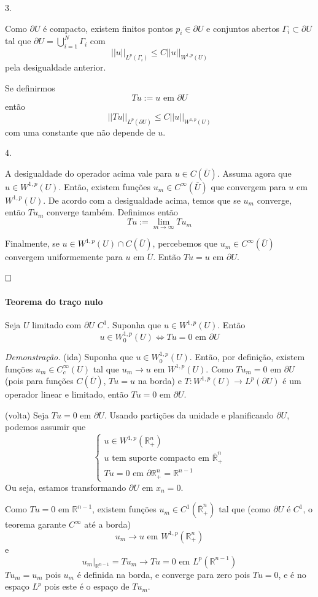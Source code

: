\documentclass[11pt]{article}
\newcommand{\qed}{$\hfill\square$}
\newcommand{\R}{\mathbb{R}}
\newcommand{\p}{\partial}
\newcommand{\pu}{\partial U}
\begin{document}
3.

Como $\pu$ é compacto, existem finitos pontos $p_i \in \pu$ e conjuntos abertos $\Gamma_i \subset \pu$ tal que $\pu = \bigcup_{i=1}^N \Gamma_i$ com \[ ||u||_{L^p(\Gamma_i)} \leq C ||u||_{W^{1,p}(U)} \] pela desigualdade anterior.

Se definirmos \[ Tu := u \text{ em } \pu \] então \[ ||Tu||_{L^p(\pu)} \leq C ||u||_{W^{1,p}(U)} \] com uma constante que não depende de $u$.


4.

A desigualdade do operador acima vale para $u \in C(\overline{U})$. Assuma agora que $u \in W^{1,p}(U)$. Então, existem funções $u_m \in C^\infty (\overline{U})$ que convergem para $u$ em $W^{1,p}(U)$. De acordo com a desigualdade acima, temos que se $u_m$ converge, então $Tu_m$ converge também. Definimos então \[ Tu := \lim_{m\rightarrow \infty} Tu_m \] 

Finalmente, se $u \in W^{1,p}(U) \cap C(\overline{U})$, percebemos que $u_m \in C^\infty(\overline{U})$ convergem uniformemente para $u$ em $\overline{U}$. Então $Tu=u$ em $\pu$.

\qed






\paragraph{Teorema do traço nulo} Seja $U$ limitado com $\pu$ $C^1$. Suponha que $u \in W^{1,p}(U)$. Então \[ u \in W^{1,p}_0(U) \Leftrightarrow Tu =0 \text{ em } \pu \]

\textit{Demonstração.} (ida) Suponha que $ u \in W^{1,p}_0(U) $. Então, por definição, existem funções $ u_m \in C^\infty_c(U) $ tal que $ u_m\rightarrow u $ em $ W^{1,p}(U) $. Como $ Tu_m=0 $ em $ \pu $ (pois para funções $ C(\overline{U}) $, $ Tu=u $ na borda) e $ T:W^{1,p}(U)\rightarrow L^p(\pu) $ é um operador linear e limitado, então $ Tu=0 $ em $ \pu $.

(volta) Seja $ Tu=0 \text{ em } \pu $. Usando partições da unidade e planificando $ \pu $, podemos assumir que \[ \begin{cases}
	u \in W^{1,p}(\R^n_+) \\
	u \text{ tem suporte compacto em } \overline{\R}^n_+\\
	Tu=0 \text{ em } \p\R^n_+ = \R^{n-1}
\end{cases} \] Ou seja, estamos transformando $ \pu $ em $ {x_n=0} $.

Como $ Tu=0 $ em $ \R^{n-1} $, existem funções $ u_m \in C^1(\overline{\R}^n_+) $ tal que (como $\pu$ é $C^1$, o teorema garante $C^\infty$ até a borda) \[ u_m \rightarrow u  \text{ em } W^{1,p}(\R^n_+)\] e \[ u_m |_{\R^{n-1}} = Tu_m  \rightarrow Tu =0  \text{ em } L^p(\R^{n-1})\] $ Tu_m=u_m $ pois $ u_m $ é definida na borda, e converge para zero pois $Tu=0$, e é no espaço $ L^p $ pois este é o espaço de $ Tu_m $.
\end{document}
